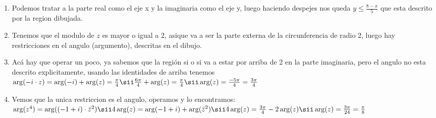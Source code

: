 \begin{enumerate}[label=\roman*)]
 \item Podemos tratar a la parte real como el eje x y la imaginaria como el eje y, luego haciendo despejes nos queda
 $y \leq \frac{8 - x}{5}$ que esta descrito por la region dibujada. 
 \item Tenemos que el modulo de $z$ es mayor o igual a 2, asique va a ser la parte externa de la circunferencia 
 de radio 2, luego hay restricciones en el angulo (argumento), descritas en el dibujo. 
 \item Acá hay que operar un poco, ya sabemos que la región si o si va a estar por arriba de 2 en la parte imaginaria, pero 
 el angulo no esta descrito explicitamente, usando las identidades de arriba tenemos $\arg(-i\cdot z) = \arg(-i) + \arg(z) = \frac{\pi}{4}
 \sii \frac{6\pi}{4} + \arg(z) = \frac{\pi}{4} \sii \arg(z) = \frac{-5\pi}{4} = \frac{3\pi}{4}$
 \item Vemos que la unica restriccion es el angulo, operamos y lo encontramos: $\arg(z^4) = \arg((-1 + i)\cdot \bar{z}^2)
 \sii 4\arg(z) = \arg(-1 + i) + \arg(\bar{z}^2) \sii 4\arg(z) = \frac{3\pi}{4} - 2\arg(z) \sii \arg(z) = \frac{3\pi}{24} = \frac{\pi}{8}$
\end{enumerate}

\begin{aportes}
 \item {}
\end{aportes}